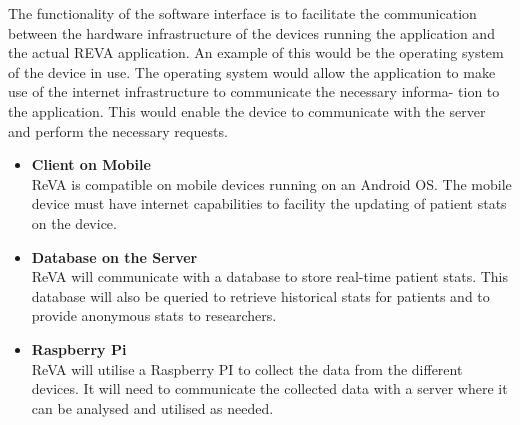 The functionality of the software interface is to facilitate the communication
between the hardware infrastructure of the devices running the application and
the actual REVA application. An example of this would be the operating system
 of the device in use. The operating system would allow the application to
make use of the internet infrastructure to communicate the necessary informa-
tion to the application. This would enable the device to communicate with the
server and perform the necessary requests.

\begin{itemize}




\item{\textbf{Client on Mobile} \\
ReVA is compatible on mobile devices running on an Android
OS. The mobile device must have internet capabilities to facility the updating of patient stats on the device.}
\item{\textbf{Database on the Server} \\
ReVA will communicate with a database to store real-time patient stats. This database will also be queried to retrieve historical stats for patients and to provide anonymous stats to researchers.}
\item{\textbf{Raspberry Pi} \\
ReVA will utilise a Raspberry PI to collect the data from the different devices. It will need to communicate the collected data with a server where it can be analysed and utilised as needed.}

\end{itemize}
